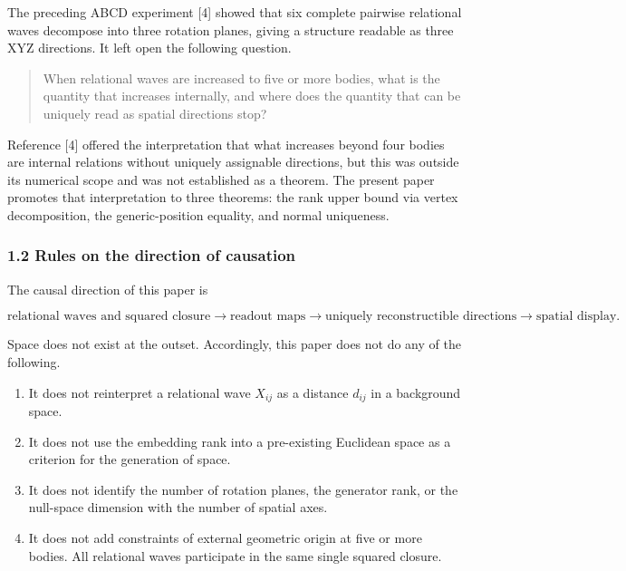 \documentclass[
  a4paper,
]{article}
\providecommand{\tightlist}{%
  \setlength{\itemsep}{0pt}\setlength{\parskip}{0pt}}
\begin{document}
The preceding ABCD experiment {[}4{]} showed that six complete pairwise
relational waves decompose into three rotation planes, giving a
structure readable as three XYZ directions. It left open the following
question.

\begin{quote}
When relational waves are increased to five or more bodies, what is the
quantity that increases internally, and where does the quantity that can
be uniquely read as spatial directions stop?
\end{quote}

Reference {[}4{]} offered the interpretation that what increases beyond
four bodies are internal relations without uniquely assignable
directions, but this was outside its numerical scope and was not
established as a theorem. The present paper promotes that interpretation
to three theorems: the rank upper bound via vertex decomposition, the
generic-position equality, and normal uniqueness.

\subsubsection{1.2 Rules on the direction of
causation}\label{rules-on-the-direction-of-causation}

The causal direction of this paper is

\[
\boxed{
\text{relational waves and squared closure}
\longrightarrow
\text{readout maps}
\longrightarrow
\text{uniquely reconstructible directions}
\longrightarrow
\text{spatial display}.
}
\]

Space does not exist at the outset. Accordingly, this paper does not do
any of the following.

\begin{enumerate}
\def\labelenumi{\arabic{enumi}.}
\tightlist
\item
  It does not reinterpret a relational wave \(X_{ij}\) as a distance
  \(d_{ij}\) in a background space.
\item
  It does not use the embedding rank into a pre-existing Euclidean space
  as a criterion for the generation of space.
\item
  It does not identify the number of rotation planes, the generator
  rank, or the null-space dimension with the number of spatial axes.
\item
  It does not add constraints of external geometric origin at five or
  more bodies. All relational waves participate in the same single
  squared closure.
\end{enumerate}
\end{document}

